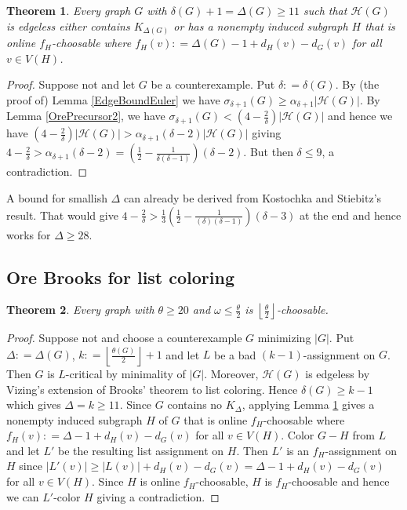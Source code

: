 \documentclass[12pt]{article}
\theoremstyle{plain}
\newtheorem{thm}{Theorem}[section]
\theoremstyle{definition}
\theoremstyle{remark}
\newcommand{\fancy}[1]{\mathcal{#1}}
\newcommand{\HH}{\fancy{H}}
\newcommand{\card}[1]{\left|#1\right|}
\newcommand{\floor}[1]{\left\lfloor#1\right\rfloor}
\newcommand{\parens}[1]{\left( #1 \right)}
\newcommand{\DefinedAs}{\mathrel{\mathop:}=}
\begin{document}
\begin{thm}\label{EdgelessEuler}
Every graph $G$ with $\delta(G) + 1 = \Delta(G) \geq 11$ such that $\HH(G)$ is edgeless either contains $K_{\Delta(G)}$ or has a nonempty induced subgraph $H$ that is online $f_H$-choosable where $f_H(v) \DefinedAs \Delta(G) - 1 + d_H(v) - d_G(v)$ for all $v \in V(H)$.
\end{thm}
\begin{proof}
Suppose not and let $G$ be a counterexample.  Put $\delta \DefinedAs \delta(G)$. By (the proof of) Lemma \ref{EdgeBoundEuler} we have $\sigma_{\delta + 1}(G) \geq \alpha_{\delta+1}\card{\HH(G)}$.  By Lemma \ref{OrePrecursor2}, we have $\sigma_{\delta + 1}(G) < \parens{4 - \frac{2}{\delta}}\card{\HH(G)}$ and hence we have $(4 - \frac{2}{\delta})\card{\HH(G)} > \alpha_{\delta + 1}(\delta - 2)\card{\HH(G)}$ giving $4 - \frac{2}{\delta} > \alpha_{\delta+1}(\delta-2) = \parens{\frac12 - \frac{1}{\delta(\delta-1)}}\parens{\delta-2}$.  But then $\delta \leq 9$, a contradiction.
\end{proof}

A bound for smallish $\Delta$ can already be derived from Kostochka and Stiebitz's result.  That would give $4 - \frac{2}{\delta} > \frac13\parens{\frac12 - \frac{1}{(\delta)(\delta-1)}}\parens{\delta-3}$ at the end and hence works for $\Delta \geq 28$.

\subsection{Ore Brooks for list coloring}
\begin{thm}\label{OurListOre}
Every graph with $\theta \geq 20$ and $\omega \leq \frac{\theta}{2}$ is $\floor{\frac{\theta}{2}}$-choosable.
\end{thm}
\begin{proof}
Suppose not and choose a counterexample $G$ minimizing $\card{G}$.  Put $\Delta \DefinedAs \Delta(G)$, $k \DefinedAs \floor{\frac{\theta(G)}{2}} + 1$ and let $L$ be a bad $(k-1)$-assignment on $G$.  Then $G$ is $L$-critical by minimality of $\card{G}$.  Moreover, $\HH(G)$ is edgeless by Vizing's extension of Brooks' theorem to list coloring. Hence $\delta(G) \geq k - 1$ which gives $\Delta = k \geq 11$.  Since $G$ contains no $K_\Delta$, applying Lemma \ref{EdgelessEuler} gives a nonempty induced subgraph $H$ of $G$ that is online $f_H$-choosable where $f_H(v) \DefinedAs \Delta - 1 + d_H(v) - d_G(v)$ for all $v \in V(H)$.  Color $G-H$ from $L$ and let $L'$ be the resulting list assignment on $H$.  Then $L'$ is an $f_H$-assignment on $H$ since $\card{L'(v)} \geq \card{L(v)} + d_H(v) - d_G(v) = \Delta - 1 + d_H(v) - d_G(v)$ for all $v \in V(H)$.  Since $H$ is online $f_H$-choosable, $H$ is $f_H$-choosable and hence we can $L'$-color $H$ giving a contradiction.
\end{proof}
\end{document}

